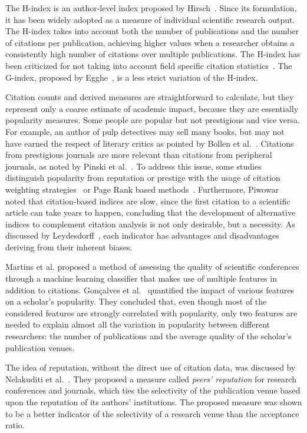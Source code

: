 \documentclass[notitlepage]{svjour3}
\begin{document}
The H-index is an author-level index proposed by Hirsch~\cite{Hirsch2005}. Since its formulation, it has been 
widely adopted as a measure of individual scientific research output.
The H-index takes into account both the number of publications and the number of citations per publication, 
achieving higher values when a researcher obtains a consistently high number of citations over multiple publications. 
The H-index has been criticized for not taking into account field specific citation
statistics~\cite{Wendl2007}. The G-index, proposed by Egghe~\cite{Egghe2006}, is a less strict variation 
of the H-index.

Citation counts and derived measures are straightforward to calculate, but they represent only a coarse
estimate of academic impact, because they are essentially popularity measures. Some people are popular but not 
prestigious and vice versa. For example, an author of pulp detectives may sell many books, but may not have earned 
the respect of literary critics as pointed by Bollen et al.~\cite{Bollen2006}. Citations from 
prestigious journals are more relevant than citations from peripheral journals, as noted by Pinski et al.~\cite{Pinski1976}. To address this issue, some studies distinguish popularity from 
reputation or prestige with the usage of citation weighting strategies~\cite{Ding2011,Yan2011a} or 
Page Rank based methods~\cite{Bollen2006,Sun2007}. 
Furthermore, Piwowar~\cite{Piwowar2013} noted that citation-based indices are slow, since the 
first citation to a scientific article can take years to happen, concluding that the development of 
alternative indices to complement citation analysis is not only desirable, but a necessity.
As discussed by Leydesdorff~\cite{Leydesdorff2009}, each indicator has advantages and disadvantages 
deriving from their inherent biases.

Martins et al. \cite{Martins2009} proposed a method of assessing the quality of scientific conferences 
through a machine learning classifier that makes use of multiple features in addition to citations.
Gonçalves et al.~\cite{Goncalves2014} quantified the impact of various features on a 
scholar's popularity. They concluded that, even though most of the considered features are strongly correlated 
with popularity, only two features are needed to explain almost all the variation in popularity between different 
researchers: the number of publications and the average quality of the scholar’s publication venues. 

The idea of reputation, without the direct use of citation data, was discussed by Nelakuditi et al.~\cite{Nelakuditi2011}. 
They proposed a measure called \textit{peers' reputation} for 
research conferences and journals, which ties the selectivity of the publication venue based upon 
the reputation of its authors' institutions. The proposed measure was shown to be a better indicator 
of the selectivity of a research venue than the acceptance ratio.
\end{document}
